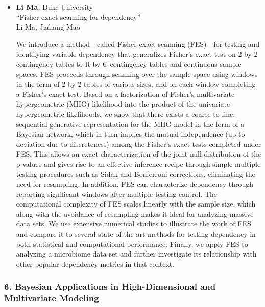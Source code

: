 \begin{itemize}
\item \textbf{Li Ma}, Duke University \\
``Fisher exact scanning for dependency'' \\
Li Ma, Jialiang Mao


We introduce a method—called Fisher exact scanning (FES)—for testing and identifying variable dependency that generalizes Fisher’s exact test on 2-by-2 contingency tables to R-by-C contingency tables and continuous sample spaces. FES proceeds through scanning over the sample space using windows in the form of 2-by-2 tables of various sizes, and on each window completing a Fisher’s exact test. Based on a factorization of Fisher’s multivariate hypergeometric (MHG) likelihood into the product of the univariate hypergeometric likelihoods, we show that there exists a coarse-to-fine, sequential generative representation for the MHG model in the form of a Bayesian network, which in turn implies the mutual independence (up to deviation due to discreteness) among the Fisher’s exact tests completed under FES. This allows an exact characterization of the joint null distribution of the p-values and gives rise to an effective inference recipe through simple multiple testing procedures such as Sidak and Bonferroni corrections, eliminating the need for resampling. In addition, FES can characterize dependency through reporting significant windows after multiple testing control. The computational complexity of FES scales linearly with the sample size, which along with the avoidance of resampling makes it ideal for analyzing massive data sets. We use extensive numerical studies to illustrate the work of FES and compare it to several state-of-the-art methods for testing dependency in both statistical and computational performance. Finally, we apply FES to analyzing a microbiome data set and further investigate its relationship with other popular dependency metrics in that context.

\end{itemize}

\subsubsection*{6. Bayesian Applications in High-Dimensional and Multivariate Modeling}

